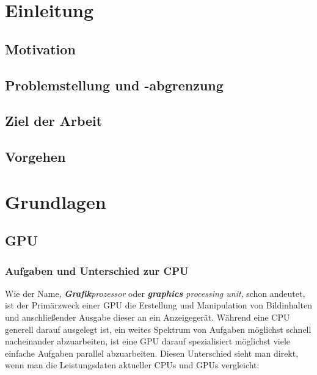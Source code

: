\documentclass[oneside]{ausarbeitung}
\begin{document}
\chapter{Einleitung}
\label{cha:einleitung}

\section{Motivation}
\label{sec:motivation}

\section{Problemstellung und -abgrenzung}
\label{sec:problemstellung}

\section{Ziel der Arbeit}
\label{sec:ziel}

\section{Vorgehen}
\label{sec:vorgehen}


\chapter{Grundlagen}
\label{cha:grundlagen}

\section{GPU}
\label{sec:GPU}

\subsection{Aufgaben und Unterschied zur CPU}
\label{sub:GPU_tasks}
Wie der Name, \textit{\textbf{Grafik}prozessor} oder \textit{\textbf{graphics} processing unit}, schon andeutet, ist der Primärzweck einer \ac{GPU} die Erstellung und Manipulation von Bildinhalten und anschließender Ausgabe dieser an ein Anzeigegerät. Während eine \ac{CPU} generell darauf ausgelegt ist, ein weites Spektrum von Aufgaben möglichst schnell nacheinander abzuarbeiten, ist eine \ac{GPU} darauf spezialisiert möglichst viele einfache Aufgaben parallel abzuarbeiten. Diesen Unterschied sieht man direkt, wenn man die Leistungsdaten aktueller \ac{CPU}s und \ac{GPU}s vergleicht:
\end{document}
